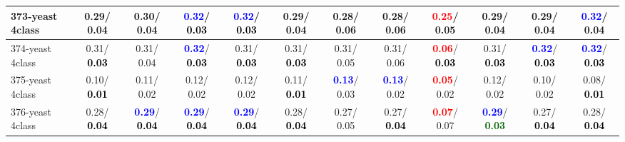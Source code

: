 \begin{table}[h]
\begin{center}
{\begin{tabular}{lc|c|c|c|c|c|c|c|c|c|c}
373-yeast 4class &   0.29/  0.04 &   0.30/  0.04 & \textcolor{blue}{\textbf{  0.32}}/\textcolor{black}{\textbf{  0.03}} & \textcolor{blue}{\textbf{  0.32}}/\textcolor{black}{\textbf{  0.03}} &   0.29/  0.04 &   0.28/  0.06 &   0.28/  0.06 & \textcolor{red}{\textbf{  0.25}}/  0.05 &   0.29/  0.04 &   0.29/  0.04 & \textcolor{blue}{\textbf{  0.32}}/  0.04 \\ \hline
374-yeast 4class &   0.31/\textcolor{black}{\textbf{  0.03}} &   0.31/  0.04 & \textcolor{blue}{\textbf{  0.32}}/\textcolor{black}{\textbf{  0.03}} &   0.31/\textcolor{black}{\textbf{  0.03}} &   0.31/\textcolor{black}{\textbf{  0.03}} &   0.31/  0.05 &   0.31/  0.06 & \textcolor{red}{\textbf{  0.06}}/\textcolor{black}{\textbf{  0.03}} &   0.31/\textcolor{black}{\textbf{  0.03}} & \textcolor{blue}{\textbf{  0.32}}/\textcolor{black}{\textbf{  0.03}} & \textcolor{blue}{\textbf{  0.32}}/\textcolor{black}{\textbf{  0.03}} \\
375-yeast 4class &   0.10/\textcolor{black}{\textbf{  0.01}} &   0.11/  0.02 &   0.12/  0.02 &   0.12/  0.02 &   0.11/\textcolor{black}{\textbf{  0.01}} & \textcolor{blue}{\textbf{  0.13}}/  0.03 & \textcolor{blue}{\textbf{  0.13}}/  0.02 & \textcolor{red}{\textbf{  0.05}}/  0.02 &   0.12/  0.02 &   0.10/  0.02 &   0.08/\textcolor{black}{\textbf{  0.01}} \\
376-yeast 4class &   0.28/\textcolor{black}{\textbf{  0.04}} & \textcolor{blue}{\textbf{  0.29}}/\textcolor{black}{\textbf{  0.04}} & \textcolor{blue}{\textbf{  0.29}}/\textcolor{black}{\textbf{  0.04}} & \textcolor{blue}{\textbf{  0.29}}/\textcolor{black}{\textbf{  0.04}} &   0.28/\textcolor{black}{\textbf{  0.04}} &   0.27/  0.05 &   0.27/\textcolor{black}{\textbf{  0.04}} & \textcolor{red}{\textbf{  0.07}}/  0.07 & \textcolor{blue}{\textbf{  0.29}}/\textcolor{darkgreen}{\textbf{  0.03}} &   0.27/\textcolor{black}{\textbf{  0.04}} &   0.28/\textcolor{black}{\textbf{  0.04}} \\\end{tabular}}\label{stratsALCKappa11Allalla}
\end{center}
\end{table}
